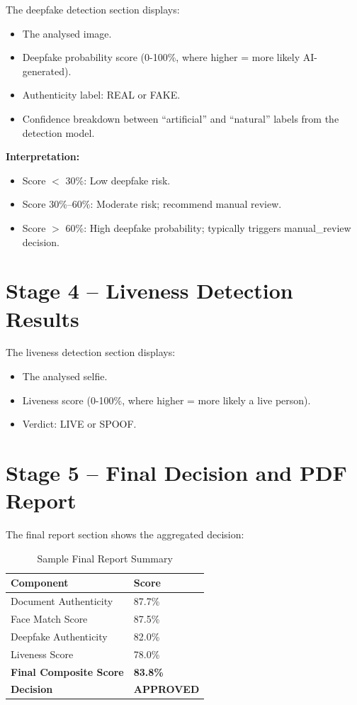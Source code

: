 The deepfake detection section displays:
\begin{itemize}
    \item The analysed image.
    \item Deepfake probability score (0-100\%, where higher = more likely AI-generated).
    \item Authenticity label: REAL or FAKE.
    \item Confidence breakdown between ``artificial'' and ``natural'' labels from the detection model.
\end{itemize}

\textbf{Interpretation:}
\begin{itemize}
    \item Score $<$ 30\%: Low deepfake risk.
    \item Score 30\%--60\%: Moderate risk; recommend manual review.
    \item Score $>$ 60\%: High deepfake probability; typically triggers manual\_review decision.
\end{itemize}

\section{Stage 4 -- Liveness Detection Results}

The liveness detection section displays:
\begin{itemize}
    \item The analysed selfie.
    \item Liveness score (0-100\%, where higher = more likely a live person).
    \item Verdict: LIVE or SPOOF.
\end{itemize}

\section{Stage 5 -- Final Decision and PDF Report}

The final report section shows the aggregated decision:

\begin{table}[H]
\centering
\caption{Sample Final Report Summary}
\begin{tabular}{@{}ll@{}}
\toprule
\textbf{Component} & \textbf{Score} \\
\midrule
Document Authenticity & 87.7\% \\
Face Match Score & 87.5\% \\
Deepfake Authenticity & 82.0\% \\
Liveness Score & 78.0\% \\
\textbf{Final Composite Score} & \textbf{83.8\%} \\
\textbf{Decision} & \textbf{APPROVED} \\
\bottomrule
\end{tabular}
\end{table}

